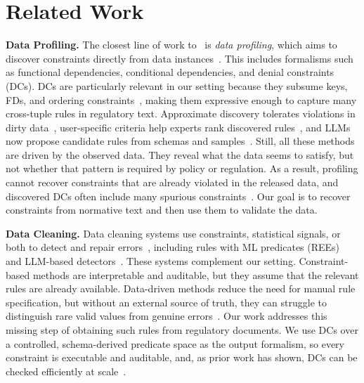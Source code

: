 \section{Related Work}
\label{sec:related}

\noindent\textbf{Data Profiling.}
The closest line of work to \system\ is \emph{data profiling}, which aims to discover constraints directly from data instances~\cite{profSurveyFelix2015,Huhtala1998TANE,Fan2009DiscoverCFD,Papenbrock2016HyFD,Bleifuss2017Hydra,chu2013discovering,Pena2022FastDC,icdePena2024}. This includes formalisms such as functional dependencies, conditional dependencies, and denial constraints (DCs). DCs are particularly relevant in our setting because they subsume keys, FDs, and ordering constraints~\cite{chu2013discovering}, making them expressive enough to capture many cross-tuple rules in regulatory text. Approximate discovery tolerates violations in dirty data~\cite{Pena2019DiscoveryDC,martin2026lima}, user-specific criteria help experts rank discovered rules~\cite{fan2023topk}, and LLMs now propose candidate rules from schemas and samples~\cite{biester2024llmclean,glock2026ledqer,li2026lcats}. Still, all these methods are driven by the observed data. They reveal what the data seems to satisfy, but not whether that pattern is required by policy or regulation. As a result, profiling cannot recover constraints that are already violated in the released data, and discovered DCs often include many spurious constraints~\cite{martin2025false}. Our goal is to recover constraints from normative text and then use them to validate the data.

\smallskip
\noindent\textbf{Data Cleaning.}
Data cleaning systems use constraints, statistical signals, or both to detect and repair errors~\cite{dataerrorsZiawash,chu2013holistic,holoclean,raha2019,peng2022garf,cleaningDeploy2024}, including rules with ML predicates (REEs)~\cite{bao2024rock} and LLM-based detectors~\cite{ni2025zeroed,zhang2024cleaning}. These systems complement our setting. Constraint-based methods are interpretable and auditable, but they assume that the relevant rules are already available. Data-driven methods reduce the need for manual rule specification, but without an external source of truth, they can struggle to distinguish rare valid values from genuine errors~\cite{cleaningDeploy2024}. Our work addresses this missing step of obtaining such rules from regulatory documents. We use DCs over a controlled, schema-derived predicate space as the output formalism, so every constraint is executable and auditable, and, as prior work has shown, DCs can be checked efficiently at scale~\cite{facet2021,liu2024rapidash,youri2024}.

